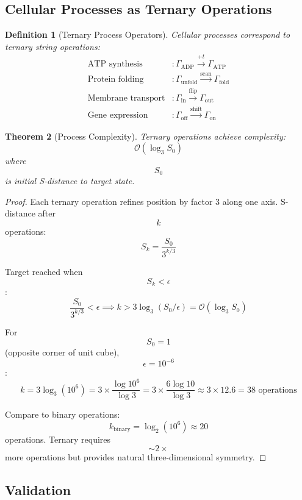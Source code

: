 \documentclass[11pt,twocolumn,a4paper]{article}
\newtheorem{theorem}{Theorem}[section]
\newtheorem{definition}[theorem]{Definition}
\theoremstyle{remark}
\begin{document}
\subsection{Cellular Processes as Ternary Operations}

\begin{definition}[Ternary Process Operators]
\label{def:ternary_operators}
Cellular processes correspond to ternary string operations:
\begin{align}
\text{ATP synthesis} &: \Gamma_{\mathrm{ADP}} \xrightarrow{+t} \Gamma_{\mathrm{ATP}} \\
\text{Protein folding} &: \Gamma_{\mathrm{unfold}} \xrightarrow{\mathrm{scan}} \Gamma_{\mathrm{fold}} \\
\text{Membrane transport} &: \Gamma_{\mathrm{in}} \xrightarrow{\mathrm{flip}} \Gamma_{\mathrm{out}} \\
\text{Gene expression} &: \Gamma_{\mathrm{off}} \xrightarrow{\mathrm{shift}} \Gamma_{\mathrm{on}}
\end{align}
\end{definition}

\begin{theorem}[Process Complexity]
\label{thm:process_complexity}
Ternary operations achieve complexity:
$$
\mathcal{O}(\log_3 S_0)
$$
where $$S_0$$ is initial S-distance to target state.
\end{theorem}

\begin{proof}
Each ternary operation refines position by factor 3 along one axis. S-distance after $$k$$ operations:
$$
S_k = \frac{S_0}{3^{k/3}}
$$

Target reached when $$S_k < \epsilon$$:
$$
\frac{S_0}{3^{k/3}} < \epsilon \implies k > 3 \log_3(S_0/\epsilon) = \mathcal{O}(\log_3 S_0)
$$

For $$S_0 = 1$$ (opposite corner of unit cube), $$\epsilon = 10^{-6}$$:
$$
k = 3 \log_3(10^6) = 3 \times \frac{\log 10^6}{\log 3} = 3 \times \frac{6 \log 10}{\log 3} \approx 3 \times 12.6 = 38 \text{ operations}
$$

Compare to binary operations: $$k_{\mathrm{binary}} = \log_2(10^6) \approx 20$$ operations. Ternary requires $$\sim 2\times$$ more operations but provides natural three-dimensional symmetry.
\end{proof}

\subsection{Validation}
\end{document}
